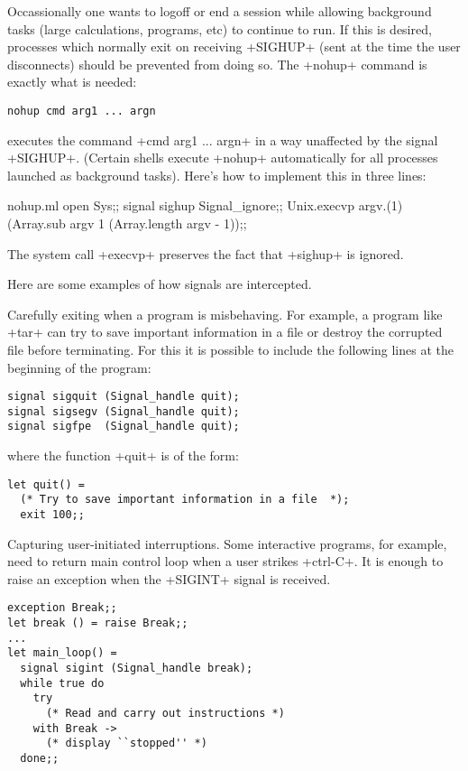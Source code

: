\begin{example}
Occassionally one wants to logoff or end a session while allowing 
background tasks (large calculations,  programs, etc) 
to continue to run.  If this is desired, processes which normally
exit on receiving \ml+SIGHUP+ (sent at the time the user disconnects)
should be prevented from doing so. The \ml+nohup+
command is exactly what is needed:
\begin{lstlisting}
nohup cmd arg1 ... argn
\end{lstlisting}
executes the command \ml+cmd arg1 ... argn+ in a way unaffected by
the signal \ml+SIGHUP+. (Certain shells execute \ml+nohup+
automatically for all processes launched as background tasks).  Here's how
to implement this in three lines:
%
\begin{listingcodefile}{nohup.ml}
open Sys;;
signal sighup Signal_ignore;;
Unix.execvp argv.(1) (Array.sub argv 1 (Array.length argv - 1));;
\end{listingcodefile}
%
The system call \ml+execvp+ preserves the fact that \ml+sighup+ is ignored.
\end{example}

Here are some examples of how signals are intercepted.

\begin{example} 
Carefully exiting when a program is misbehaving. For example,
a program like \ml+tar+ can try to save important information
in a file or destroy the corrupted file before terminating.  For this 
it is possible to include the following lines at the beginning of the program:
%
\begin{lstlisting}
signal sigquit (Signal_handle quit);
signal sigsegv (Signal_handle quit);
signal sigfpe  (Signal_handle quit);
\end{lstlisting}
%
where the function \ml+quit+ is of the form:
%
\begin{lstlisting}
let quit() =
  (* Try to save important information in a file  *);
  exit 100;;
\end{lstlisting}
\end{example}

\begin{example} 
Capturing user-initiated interruptions. Some interactive programs, 
for example, need to return main control loop when a user
strikes \ml+ctrl-C+.  It is enough to raise an exception when the
\ml+SIGINT+ signal is received.

%
\begin{lstlisting}
exception Break;;
let break () = raise Break;;
...
let main_loop() =
  signal sigint (Signal_handle break);
  while true do
    try
      (* Read and carry out instructions *)
    with Break ->
      (* display ``stopped'' *)
  done;;
\end{lstlisting}
\end{example}

